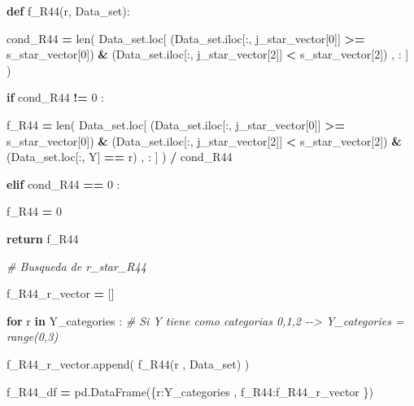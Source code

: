 \documentclass[
  11pt,
  a4paper,
]{article}
\newenvironment{Shaded}{\begin{snugshade}}{\end{snugshade}}
\newcommand{\BuiltInTok}[1]{#1}
\newcommand{\CommentTok}[1]{\textcolor[rgb]{0.56,0.35,0.01}{\textit{#1}}}
\newcommand{\ControlFlowTok}[1]{\textcolor[rgb]{0.13,0.29,0.53}{\textbf{#1}}}
\newcommand{\DecValTok}[1]{\textcolor[rgb]{0.00,0.00,0.81}{#1}}
\newcommand{\KeywordTok}[1]{\textcolor[rgb]{0.13,0.29,0.53}{\textbf{#1}}}
\newcommand{\NormalTok}[1]{#1}
\newcommand{\OperatorTok}[1]{\textcolor[rgb]{0.81,0.36,0.00}{\textbf{#1}}}
\newcommand{\StringTok}[1]{\textcolor[rgb]{0.31,0.60,0.02}{#1}}
\begin{document}
\begin{Shaded}
\begin{Highlighting}[]
                \KeywordTok{def}\NormalTok{ f\_R44(r, Data\_set):}

\NormalTok{                        cond\_R44 }\OperatorTok{=} \BuiltInTok{len}\NormalTok{( Data\_set.loc[ (Data\_set.iloc[:, j\_star\_vector[}\DecValTok{0}\NormalTok{]] }\OperatorTok{\textgreater{}=}\NormalTok{ s\_star\_vector[}\DecValTok{0}\NormalTok{]) }\OperatorTok{\&}\NormalTok{ (Data\_set.iloc[:, j\_star\_vector[}\DecValTok{2}\NormalTok{]] }\OperatorTok{\textless{}}\NormalTok{ s\_star\_vector[}\DecValTok{2}\NormalTok{]) , : ] ) }

                        \ControlFlowTok{if}\NormalTok{  cond\_R44 }\OperatorTok{!=} \DecValTok{0}\NormalTok{ :}

\NormalTok{                            f\_R44 }\OperatorTok{=} \BuiltInTok{len}\NormalTok{( Data\_set.loc[ (Data\_set.iloc[:, j\_star\_vector[}\DecValTok{0}\NormalTok{]] }\OperatorTok{\textgreater{}=}\NormalTok{ s\_star\_vector[}\DecValTok{0}\NormalTok{]) }\OperatorTok{\&}\NormalTok{ (Data\_set.iloc[:, j\_star\_vector[}\DecValTok{2}\NormalTok{]] }\OperatorTok{\textless{}}\NormalTok{ s\_star\_vector[}\DecValTok{2}\NormalTok{]) }\OperatorTok{\&}\NormalTok{ (Data\_set.loc[:, }\StringTok{\textquotesingle{}Y\textquotesingle{}}\NormalTok{] }\OperatorTok{==}\NormalTok{ r) , : ] ) }\OperatorTok{/}\NormalTok{ cond\_R44}

                        \ControlFlowTok{elif}\NormalTok{ cond\_R44 }\OperatorTok{==} \DecValTok{0}\NormalTok{ :}

\NormalTok{                            f\_R44 }\OperatorTok{=} \DecValTok{0}

                        \ControlFlowTok{return}\NormalTok{ f\_R44}

                
            \CommentTok{\# Busqueda de r\_star\_R44}

\NormalTok{                f\_R44\_r\_vector }\OperatorTok{=}\NormalTok{ []}

                \ControlFlowTok{for}\NormalTok{ r }\KeywordTok{in}\NormalTok{ Y\_categories :  }\CommentTok{\# Si Y tiene como categorias 0,1,2 {-}{-}\textgreater{} Y\_categories = range(0,3)}

\NormalTok{                    f\_R44\_r\_vector.append( f\_R44(r , Data\_set) )}

\NormalTok{                f\_R44\_df }\OperatorTok{=}\NormalTok{ pd.DataFrame(\{}\StringTok{\textquotesingle{}r\textquotesingle{}}\NormalTok{:Y\_categories  , }\StringTok{\textquotesingle{}f\_R44\textquotesingle{}}\NormalTok{:f\_R44\_r\_vector \})}
        

\end{Highlighting}
\end{Shaded}
\end{document}
